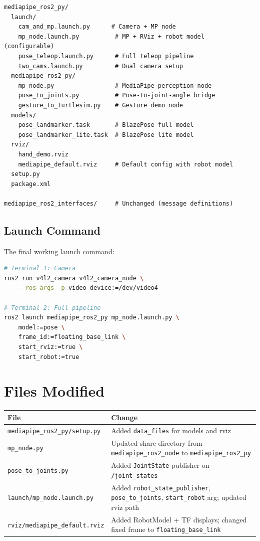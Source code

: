 \documentclass[11pt,a4paper]{article}
\begin{document}
\begin{lstlisting}
mediapipe_ros2_py/
  launch/
    cam_and_mp.launch.py      # Camera + MP node
    mp_node.launch.py          # MP + RViz + robot model (configurable)
    pose_teleop.launch.py      # Full teleop pipeline
    two_cams.launch.py         # Dual camera setup
  mediapipe_ros2_py/
    mp_node.py                 # MediaPipe perception node
    pose_to_joints.py          # Pose-to-joint-angle bridge
    gesture_to_turtlesim.py    # Gesture demo node
  models/
    pose_landmarker.task       # BlazePose full model
    pose_landmarker_lite.task  # BlazePose lite model
  rviz/
    hand_demo.rviz
    mediapipe_default.rviz     # Default config with robot model
  setup.py
  package.xml

mediapipe_ros2_interfaces/     # Unchanged (message definitions)
\end{lstlisting}

\subsection{Launch Command}

The final working launch command:

\begin{lstlisting}[language=bash]
# Terminal 1: Camera
ros2 run v4l2_camera v4l2_camera_node \
    --ros-args -p video_device:=/dev/video4

# Terminal 2: Full pipeline
ros2 launch mediapipe_ros2_py mp_node.launch.py \
    model:=pose \
    frame_id:=floating_base_link \
    start_rviz:=true \
    start_robot:=true
\end{lstlisting}

\section{Files Modified}

\begin{center}
\begin{longtable}{lp{8cm}}
\toprule
\textbf{File} & \textbf{Change} \\
\midrule
\texttt{mediapipe\_ros2\_py/setup.py} & Added \texttt{data\_files} for models and rviz \\
\texttt{mp\_node.py} & Updated share directory from \texttt{mediapipe\_ros2\_node} to \texttt{mediapipe\_ros2\_py} \\
\texttt{pose\_to\_joints.py} & Added \texttt{JointState} publisher on \texttt{/joint\_states} \\
\texttt{launch/mp\_node.launch.py} & Added \texttt{robot\_state\_publisher}, \texttt{pose\_to\_joints}, \texttt{start\_robot} arg; updated rviz path \\
\texttt{rviz/mediapipe\_default.rviz} & Added RobotModel + TF displays; changed fixed frame to \texttt{floating\_base\_link} \\
\bottomrule
\end{longtable}
\end{center}
\end{document}
